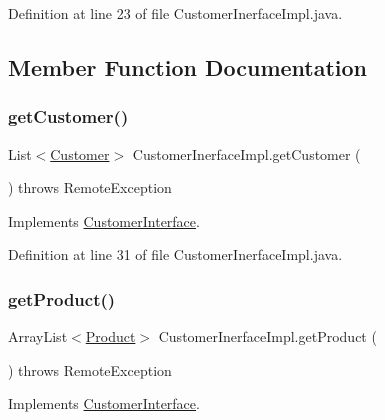 Definition at line 23 of file Customer\+Inerface\+Impl.\+java.



\subsection{Member Function Documentation}
\mbox{\label{class_customer_inerface_impl_a488e7019e10ff327c1ddda2df06aafc2}} 
\subsubsection{\texorpdfstring{getCustomer()}{getCustomer()}}
{\footnotesize\ttfamily List$<$\mbox{\hyperlink{class_customer}{Customer}}$>$ Customer\+Inerface\+Impl.\+get\+Customer (\begin{DoxyParamCaption}{ }\end{DoxyParamCaption}) throws Remote\+Exception}



Implements \mbox{\hyperlink{interface_customer_interface_ae6fd6f70022bbb0e6600c7bcaf3e139c}{Customer\+Interface}}.



Definition at line 31 of file Customer\+Inerface\+Impl.\+java.

\mbox{\label{class_customer_inerface_impl_aae8b5ef23db5d8e651663cd8e29ac013}} 
\subsubsection{\texorpdfstring{getProduct()}{getProduct()}}
{\footnotesize\ttfamily Array\+List$<$\mbox{\hyperlink{class_product}{Product}}$>$ Customer\+Inerface\+Impl.\+get\+Product (\begin{DoxyParamCaption}{ }\end{DoxyParamCaption}) throws Remote\+Exception}



Implements \mbox{\hyperlink{interface_customer_interface_a671bbfd3dfb9bbc58d3c9d04f38da627}{Customer\+Interface}}.



